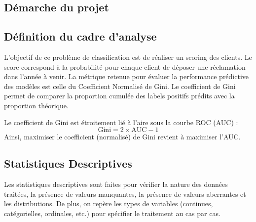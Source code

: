 \documentclass[french]{article}
\begin{document}
\begin{multicols}{2}
\section{Démarche du projet}

\subsection{Définition du cadre d'analyse}

L'objectif de ce problème de classification est de réaliser un scoring des clients. Le score correspond à la probabilité pour chaque client de déposer une réclamation dans l'année à venir. La métrique retenue pour évaluer la performance prédictive des modèles est celle du Coefficient Normalisé de Gini. Le coefficient de Gini permet de comparer la proportion cumulée des labels positifs prédits avec la proportion théorique. 

Le coefficient de Gini est étroitement lié à l'aire sous la courbe ROC (AUC) :
\[ \text{Gini} = 2 \times \text{AUC} - 1 \]
Ainsi, maximiser le coefficient (normalisé) de Gini revient à maximiser l'AUC.






\subsection{Statistiques Descriptives}

Les statistiques descriptives sont faites pour vérifier la nature des données traitées, la présence de valeurs manquantes, la présence de valeurs aberrantes et les distributions. De plus, on repère les types de variables (continues, catégorielles, ordinales, etc.) pour spécifier le traitement au cas par cas.


\end{multicols}
\end{document}
